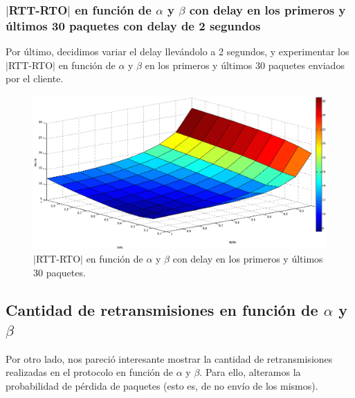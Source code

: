 \documentclass[10pt, a4paper]{article}
\begin{document}

\subsubsection{$|$RTT-RTO$|$ en función de $\alpha$ y $\beta$ con delay en los primeros y últimos 30 paquetes con delay de 2 segundos}
Por último, decidimos variar el delay llevándolo a 2 segundos, y experimentar los $|$RTT-RTO$|$ en función de $\alpha$ y $\beta$ en los primeros y últimos 30 paquetes enviados por el cliente.

\begin{figure}[H]
\begin{center}
\includegraphics[width=17cm]{delay-30F30L-2seg.png}
\caption{$|$RTT-RTO$|$ en función de $\alpha$ y $\beta$ con delay en los primeros y últimos 30 paquetes.}
\end{center}
\end{figure}


\newpage
\subsection{Cantidad de retransmisiones en función de $\alpha$ y $\beta$}
Por otro lado, nos pareció interesante mostrar la cantidad de retransmisiones realizadas en el protocolo en función de $\alpha$ y $\beta$. Para ello, alteramos la probabilidad de pérdida de paquetes (esto es, de no envío de los mismos). 
\end{document}
